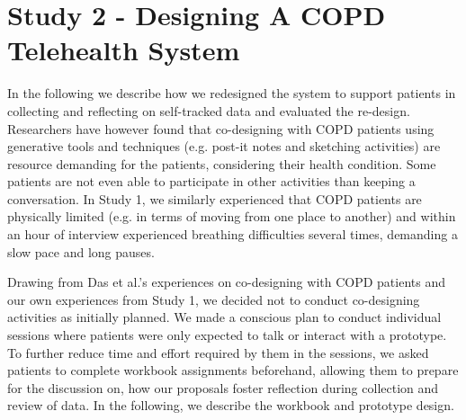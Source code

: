 \section{Study 2 - Designing A COPD Telehealth System}     
In the following we describe how we redesigned the system to support patients in collecting and reflecting on self-tracked data and evaluated the re-design. Researchers have however found that co-designing with COPD patients using generative tools and techniques (e.g. post-it notes and sketching activities) are resource demanding for the patients, considering their health condition. Some patients are not even able to participate in other activities than keeping a conversation. In Study 1, we similarly experienced that COPD patients are physically limited (e.g. in terms of moving from one place to another) and within an hour of interview experienced breathing difficulties several times, demanding a slow pace and long pauses. 

Drawing from Das et al.’s experiences on co-designing with COPD patients \cite{Das} and our own experiences from Study 1, we decided not to conduct co-designing activities as initially planned. We made a conscious plan to conduct individual sessions where patients were only expected to talk or interact with a prototype. To further reduce time and effort required by them in the sessions, we asked patients to complete workbook assignments beforehand, allowing them to prepare for the discussion on, how our proposals foster reflection during collection and review of data. In the following, we describe the workbook and prototype design. 

